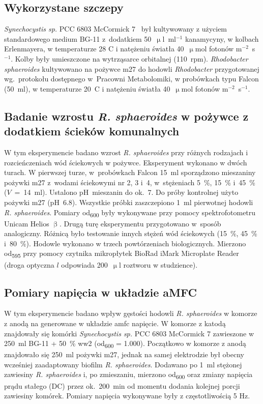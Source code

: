 \subsection{Wykorzystane szczepy}\label{subsec:szczepy}
\textit{Synechocystis sp.} PCC 6803 McCormick 7~\cite{Puchalski2021}
był kultywowany z użyciem standardowego medium BG-11 z~dodatkiem 
50~$\upmu$l~ml$^{-1}$ kanamycyny, w kolbach Erlenmayera,
w temperaturze 28 \degree C i natężeniu światła
40~$\upmu$mol fotonów m$^{-2}$~s$^{-1}$.
Kolby były umieszczone na wytrząsarce orbitalnej (110~rpm).
\textit{Rhodobacter sphaeroides} kultywowano na pożywce \acrshort{m27}
do hodowli \textit{Rhodobacter} przygotowanej wg.\ protokołu
dostępnego w~Pracowni Metabolomiki, w probówkach typu
Falcon (50~ml), w temperaturze 20~\degree C i natężeniu światła
40~$\upmu$mol fotonów m$^{-2}$~s$^{-1}$.

\subsection{Badanie wzrostu \textit{R. sphaeroides} w pożywce z dodatkiem ścieków komunalnych}\label{subsec:rhodobacter}
W tym eksperymencie badano wzrost \textit{R. sphaeroides} przy
różnych rodzajach i rozcieńczeniach wód ściekowych w pożywce.
Eksperyment wykonano w dwóch turach.
W pierwszej turze, w~probówkach Falcon 15~ml sporządzono
mieszaniny pożywki \acrshort{m27} z~wodami ściekowymi nr 2, 3 i~4,
w~stężeniach 5~\%, 15~\% i~45~\% ($V$~=~14~ml).
Ustalono pH~mieszanin do ok.\ 7.
Do próby kontrolnej użyto pożywki \acrshort{m27} (pH~6.8).
Wszystkie próbki zaszczepiono 1~ml pierwotnej hodowli
\textit{R. sphaeroides}.
Pomiary \acrshort{od}\textsubscript{600} były wykonywane przy pomocy
spektrofotometru Unicam Helios $\upbeta$.
Drugą turę eksperymentu przygotowano w~sposób analogiczny.
Różnicą było testowanie innych stężeń wód ściekowych
(15~\%, 45~\% i~80~\%).
Hodowle wykonano w trzech powtórzeniach biologicznych.
Mierzono \acrshort{od}\textsubscript{595} przy pomocy czytnika
mikropłytek BioRad iMark Microplate Reader
(droga optyczna $l$ odpowiada 200~$\upmu$l roztworu w studzience).

\subsection{Pomiary napięcia w układzie aMFC}\label{subsec:volt}
W tym eksperymencie badano wpływ gęstości hodowli
\textit{R. sphaeroides} w komorze z anodą na generowane
w układzie \acrshort{amfc} napięcie.
W komorze z katodą znajdowały się komórki
\textit{Synechocystis sp.} PCC 6803 McCormick 7
zawieszone w 250~ml BG-11 + 50~\% \acrshort{ww}2
(\acrshort{od}\textsubscript{600} = 1.000).
Początkowo w komorze z anodą znajdowało się 250~ml
pożywki \acrshort{m27}, jednak na samej elektrodzie był
obecny wcześniej zaadaptowany biofilm \textit{R. sphaeroides}.
Dodawano po 1~ml stężonej zawiesiny \textit{R. sphaeroides}
i, po zmieszaniu, mierzono \acrshort{od}\textsubscript{600} oraz
zmiany napięcia prądu stałego (DC) przez ok.\ 200~min od
momentu dodania kolejnej porcji zawiesiny komórek.
Pomiary napięcia wykonywane były z częstotliwością 5 Hz.

